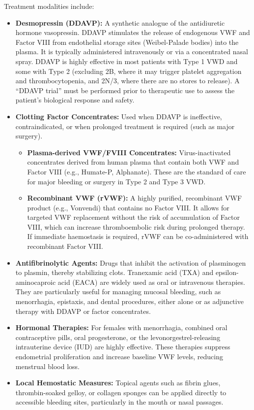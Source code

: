 Treatment modalities include:
\begin{itemize}
    \item \textbf{Desmopressin (DDAVP):} A synthetic analogue of the antidiuretic hormone vasopressin. DDAVP stimulates the release of endogenous VWF and Factor VIII from endothelial storage sites (Weibel-Palade bodies) into the plasma. It is typically administered intravenously or via a concentrated nasal spray. DDAVP is highly effective in most patients with Type 1 VWD and some with Type 2 (excluding 2B, where it may trigger platelet aggregation and thrombocytopenia, and 2N/3, where there are no stores to release). A ``DDAVP trial'' must be performed prior to therapeutic use to assess the patient's biological response and safety.
    \item \textbf{Clotting Factor Concentrates:} Used when DDAVP is ineffective, contraindicated, or when prolonged treatment is required (such as major surgery).
    \begin{itemize}
        \item \textbf{Plasma-derived VWF/FVIII Concentrates:} Virus-inactivated concentrates derived from human plasma that contain both VWF and Factor VIII (e.g., Humate-P, Alphanate). These are the standard of care for major bleeding or surgery in Type 2 and Type 3 VWD.
        \item \textbf{Recombinant VWF (rVWF):} A highly purified, recombinant VWF product (e.g., Vonvendi) that contains no Factor VIII. It allows for targeted VWF replacement without the risk of accumulation of Factor VIII, which can increase thromboembolic risk during prolonged therapy. If immediate haemostasis is required, rVWF can be co-administered with recombinant Factor VIII.
    \end{itemize}
    \item \textbf{Antifibrinolytic Agents:} Drugs that inhibit the activation of plasminogen to plasmin, thereby stabilizing clots. Tranexamic acid (TXA) and epsilon-aminocaproic acid (EACA) are widely used as oral or intravenous therapies. They are particularly useful for managing mucosal bleeding, such as menorrhagia, epistaxis, and dental procedures, either alone or as adjunctive therapy with DDAVP or factor concentrates.
    \item \textbf{Hormonal Therapies:} For females with menorrhagia, combined oral contraceptive pills, oral progesterone, or the levonorgestrel-releasing intrauterine device (IUD) are highly effective. These therapies suppress endometrial proliferation and increase baseline VWF levels, reducing menstrual blood loss.
    \item \textbf{Local Hemostatic Measures:} Topical agents such as fibrin glues, thrombin-soaked gelloy, or collagen sponges can be applied directly to accessible bleeding sites, particularly in the mouth or nasal passages.
\end{itemize}

